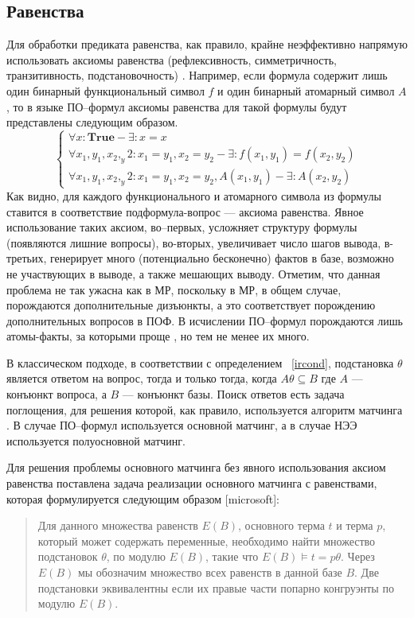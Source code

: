 \subsection{Равенства}
Для обработки предиката равенства, как правило, крайне неэффективно напрямую использовать аксиомы равенства (рефлексивность, симметричность, транзитивность, подстановочность) . Например, если формула содержит лишь один бинарный функциональный символ $f$ и один бинарный атомарный символ $A$, то в языке ПО--формул аксиомы равенства для такой формулы будут представлены следующим образом.
$$\left\lbrace
\begin{array}{l}
\forall x\colon\boldsymbol{True} - \exists\colon x = x \\
\forall x_1,y_1,x_2,_y2\colon x_1 = y_1, x_2 = y_2 - \exists\colon f(x_1,y_1) = f(x_2, y_2) \\
\forall x_1,y_1,x_2,_y2\colon x_1 = y_1, x_2 = y_2, A(x_1,y_1) - \exists\colon A(x_2,y_2)
\end{array}\right.
$$
Как видно, для каждого функционального и атомарного символа из формулы ставится в соответствие подформула-вопрос --- аксиома равенства. Явное использование таких аксиом, во--первых, усложняет структуру формулы (появляются лишние вопросы), во-вторых,  увеличивает число шагов вывода, в-третьих, генерирует много (потенциально бесконечно) фактов в базе, возможно не участвующих в выводе, а также мешающих выводу. Отметим, что данная проблема не так ужасна как в МР, поскольку в МР, в общем случае,  порождаются дополнительные дизъюнкты, а это соответствует порождению дополнительных вопросов в ПОФ. В исчислении ПО--формул порождаются лишь атомы-факты, за которыми проще , но тем не менее их много.

В классическом подходе, в соответствии с определением ~\ref{ircond}, подстановка $\theta$ является ответом на вопрос, тогда и только тогда, когда $A \theta \subseteq B$ где $A$ --- конъюнкт вопроса, а $B$ --- конъюнкт базы. Поиск ответов есть задача поглощения, для решения которой, как правило, используется алгоритм матчинга . В случае ПО--формул используется основной матчинг, а в случае НЭЭ используется полуосновной матчинг. 

Для решения проблемы основного матчинга без явного использования аксиом равенства поставлена задача реализации основного матчинга с равенствами, которая формулируется следующим образом [microsoft]:
\begin{quote}
Для данного множества равенств $E(B)$, основного терма $t$ и терма $p$, который может содержать переменные, необходимо найти множество подстановок $\theta$, по модулю $E(B)$, такие что $E(B)\models t = p\theta$. Через $E(B)$ мы обозначим множество всех равенств в данной базе $B$. Две подстановки эквивалентны если их правые части попарно конгруэнты по модулю $E(B)$.
\end{quote}

